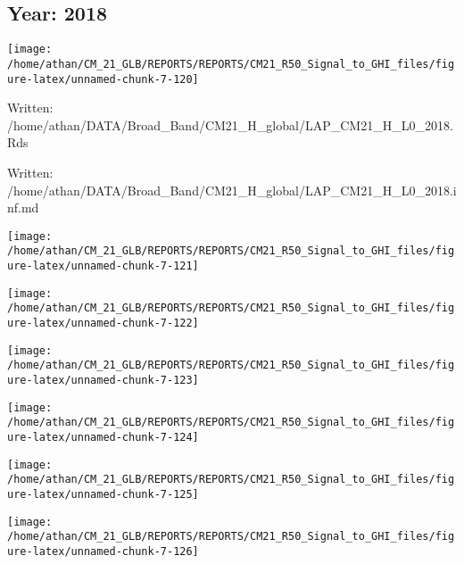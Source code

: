 \documentclass[
  11pt,
  a4paper,oneside]{article}
\begin{document}
\FloatBarrier

\newpage

\hypertarget{year-2018}{%
\subsection{Year: 2018}\label{year-2018}}

\begin{center}\texttt{[image: /home/athan/CM\_21\_GLB/REPORTS/REPORTS/CM21\_R50\_Signal\_to\_GHI\_files/figure-latex/unnamed-chunk-7-120]} \end{center}

Written: /home/athan/DATA/Broad\_Band/CM21\_H\_global/LAP\_CM21\_H\_L0\_2018.Rds

Written: /home/athan/DATA/Broad\_Band/CM21\_H\_global/LAP\_CM21\_H\_L0\_2018.inf.md

\begin{center}\texttt{[image: /home/athan/CM\_21\_GLB/REPORTS/REPORTS/CM21\_R50\_Signal\_to\_GHI\_files/figure-latex/unnamed-chunk-7-121]} \end{center}

\begin{center}\texttt{[image: /home/athan/CM\_21\_GLB/REPORTS/REPORTS/CM21\_R50\_Signal\_to\_GHI\_files/figure-latex/unnamed-chunk-7-122]} \end{center}

\begin{center}\texttt{[image: /home/athan/CM\_21\_GLB/REPORTS/REPORTS/CM21\_R50\_Signal\_to\_GHI\_files/figure-latex/unnamed-chunk-7-123]} \end{center}

\begin{center}\texttt{[image: /home/athan/CM\_21\_GLB/REPORTS/REPORTS/CM21\_R50\_Signal\_to\_GHI\_files/figure-latex/unnamed-chunk-7-124]} \end{center}

\begin{center}\texttt{[image: /home/athan/CM\_21\_GLB/REPORTS/REPORTS/CM21\_R50\_Signal\_to\_GHI\_files/figure-latex/unnamed-chunk-7-125]} \end{center}

\begin{center}\texttt{[image: /home/athan/CM\_21\_GLB/REPORTS/REPORTS/CM21\_R50\_Signal\_to\_GHI\_files/figure-latex/unnamed-chunk-7-126]} \end{center}
\end{document}
